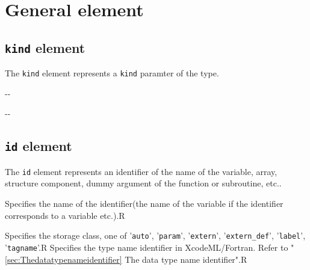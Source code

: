 \section{General element}


\subsection{ {\tt kind} element}

The {\tt kind} element represents a {\tt kind} paramter of the type.


\begin{XcodeMLChildElements}
\XcodeMLElementDef{-}
{-}{-}
\end{XcodeMLChildElements}

\begin{XcodeMLAttributes}
\XcodeMLAttrDef{-}{-}
{-}{-}
\end{XcodeMLAttributes}


\subsection{ {\tt id} element}

The {\tt id} element represents an identifier of the name of the variable, array,
structure component, dummy argument of the function or subroutine, etc..


\begin{XcodeMLChildElements}
{Specifies the name of the identifier(the name of the variable if the identifier corresponds to a variable etc.).}{R}
\end{XcodeMLChildElements}

\begin{XcodeMLAttributes}
{Specifies the storage class, one of '{\tt auto}', '{\tt param}', '{\tt extern}', '{\tt extern\_def}', '{\tt label}', '{\tt tagname}'.}{R}
{Specifies the type name identifier in XcodeML/Fortran.
 Refer to "\ref{sec:Thedatatypenameidentifier} The data type name identifier".}{R}
\end{XcodeMLAttributes}

